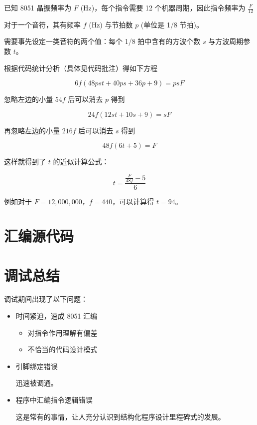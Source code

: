 已知 8051 晶振频率为 $F$ (Hz)，每个指令需要 12 个机器周期，因此指令频率为 $\frac{F}{12}$

对于一个音符，其有频率 $f$ (Hz) 与节拍数 $p$ (单位是 1/8 节拍)。

需要事先设定一类音符的两个值：每个 1/8 拍中含有的方波个数 $s$ 与方波周期参数 $t$。

根据代码统计分析（具体见代码批注）得如下方程

$$
6 f (48 p s t + 40 p s + 36 p + 9) = p s F
$$

忽略左边的小量 $54 f$ 后可以消去 $p$ 得到

$$
24 f (12 s t + 10 s + 9) = s F
$$

再忽略左边的小量 $216 f$ 后可以消去 $s$ 得到

$$
48 f (6 t + 5) = F
$$

这样就得到了 $t$ 的近似计算公式：

\begin{equation}
t = \frac{\frac{F}{48 f} - 5}{6} \tag{1}
\end{equation}

例如对于 $F = 12,000,000$，$f = 440$，可以计算得 $t = 94$。

\section{汇编源代码}



\section{调试总结}

调试期间出现了以下问题：

\begin{itemize}
    \item 时间紧迫，速成 8051 汇编
    
    \begin{itemize}
        \item 对指令作用理解有偏差
        \item 不恰当的代码设计模式
    \end{itemize}
    
    \item 引脚绑定错误
    
    迅速被调通。
    
    \item 程序中汇编指令逻辑错误
    
    这是常有的事情，让人充分认识到结构化程序设计里程碑式的发展。
    
\end{itemize}
